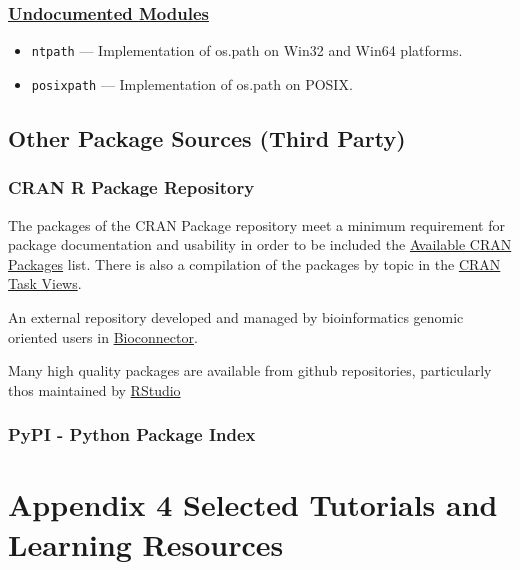 \documentclass[]{book}
\providecommand{\tightlist}{%
  \setlength{\itemsep}{0pt}\setlength{\parskip}{0pt}}
\theoremstyle{definition}
\theoremstyle{definition}
\theoremstyle{definition}
\theoremstyle{remark}
\begin{document}
\subsection{\texorpdfstring{\href{https://docs.python.org/3.7/library/undoc.html}{Undocumented
Modules}}{Undocumented Modules}}\label{undocumented-modules}

\begin{itemize}
\tightlist
\item
  \texttt{ntpath} --- Implementation of os.path on Win32 and Win64
  platforms.
\item
  \texttt{posixpath} --- Implementation of os.path on POSIX.
\end{itemize}

\section{Other Package Sources (Third
Party)}\label{other-package-sources-third-party}

\subsection{CRAN R Package Repository}\label{cran-r-package-repository}

The packages of the CRAN Package repository meet a minimum requirement
for package documentation and usability in order to be included the
\href{https://cran.cnr.berkeley.edu/web/packages/index.html}{Available
CRAN Packages} list. There is also a compilation of the packages by
topic in the \href{https://cran.cnr.berkeley.edu/web/views/}{CRAN Task
Views}.

An external repository developed and managed by bioinformatics genomic
oriented users in \href{https://www.bioconductor.org/}{Bioconnector}.

Many high quality packages are available from github repositories,
particularly thos maintained by
\href{https://www.rstudio.com/products/rpackages/}{RStudio}

\subsection{PyPI - Python Package
Index}\label{pypi---python-package-index}

\chapter{Appendix 4 Selected Tutorials and Learning
Resources}\label{appendix-4-selected-tutorials-and-learning-resources}
\end{document}
